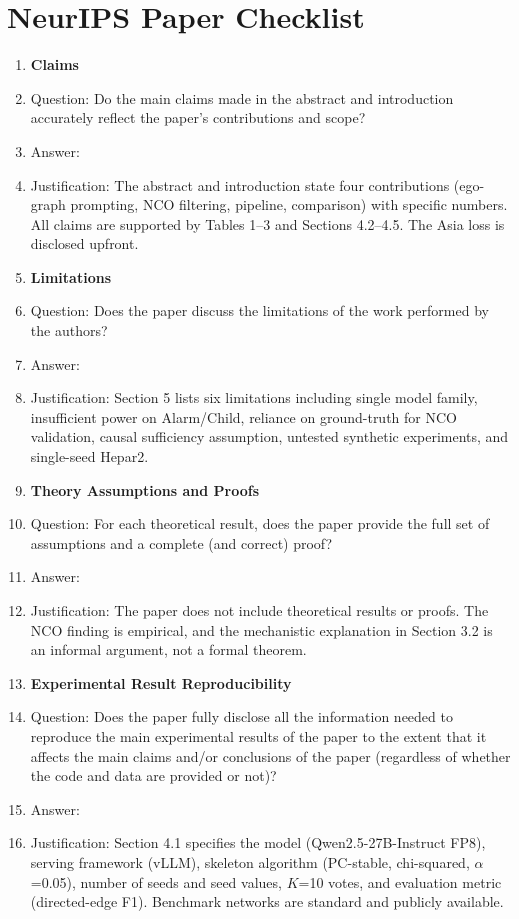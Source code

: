 \section*{NeurIPS Paper Checklist}

\begin{enumerate}

\item {\bf Claims}
    \item[] Question: Do the main claims made in the abstract and introduction accurately reflect the paper's contributions and scope?
    \item[] Answer: \answerYes{}
    \item[] Justification: The abstract and introduction state four contributions (ego-graph prompting, NCO filtering, pipeline, comparison) with specific numbers. All claims are supported by Tables 1--3 and Sections 4.2--4.5. The Asia loss is disclosed upfront.

\item {\bf Limitations}
    \item[] Question: Does the paper discuss the limitations of the work performed by the authors?
    \item[] Answer: \answerYes{}
    \item[] Justification: Section 5 lists six limitations including single model family, insufficient power on Alarm/Child, reliance on ground-truth for NCO validation, causal sufficiency assumption, untested synthetic experiments, and single-seed Hepar2.

\item {\bf Theory Assumptions and Proofs}
    \item[] Question: For each theoretical result, does the paper provide the full set of assumptions and a complete (and correct) proof?
    \item[] Answer: \answerNA{}
    \item[] Justification: The paper does not include theoretical results or proofs. The NCO finding is empirical, and the mechanistic explanation in Section 3.2 is an informal argument, not a formal theorem.

\item {\bf Experimental Result Reproducibility}
    \item[] Question: Does the paper fully disclose all the information needed to reproduce the main experimental results of the paper to the extent that it affects the main claims and/or conclusions of the paper (regardless of whether the code and data are provided or not)?
    \item[] Answer: \answerYes{}
    \item[] Justification: Section 4.1 specifies the model (Qwen2.5-27B-Instruct FP8), serving framework (vLLM), skeleton algorithm (PC-stable, chi-squared, $\alpha$=0.05), number of seeds and seed values, $K$=10 votes, and evaluation metric (directed-edge F1). Benchmark networks are standard and publicly available.


\end{enumerate}
